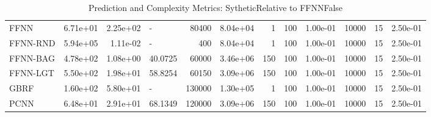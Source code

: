 \begin{table}
\centering
\caption{Prediction and Complexity Metrics: SytheticRelative to FFNNFalse}
\label{tab__Sythetic__Fix_Neurons_QTrue}
\begin{tabular}{lrrlrrrrrrr}
\midrule
FFNN     & 6.71e+01 & 2.25e+02 &        - &          80400 &  8.04e+04 &         1 &  100 &  1.00e-01 &  10000 &     15 & 2.50e-01 \\
FFNN-RND & 5.94e+05 & 1.11e-02 &        - &            400 &  8.04e+04 &         1 &  100 &  1.00e-01 &  10000 &     15 & 2.50e-01 \\
FFNN-BAG & 4.78e+02 & 1.08e+00 &  40.0725 &          60000 &  3.46e+06 &       150 &  100 &  1.00e-01 &  10000 &     15 & 2.50e-01 \\
FFNN-LGT & 5.50e+02 & 1.98e+01 &  58.8254 &          60150 &  3.09e+06 &       150 &  100 &  1.00e-01 &  10000 &     15 & 2.50e-01 \\
GBRF     & 1.60e+02 & 5.80e+01 &        - &         130000 &  1.30e+05 &         1 &  100 &  1.00e-01 &  10000 &     15 & 2.50e-01 \\
PCNN     & 6.48e+01 & 2.91e+01 &  68.1349 &         120000 &  3.09e+06 &       150 &  100 &  1.00e-01 &  10000 &     15 & 2.50e-01 \\
\bottomrule
\end{tabular}
\end{table}
